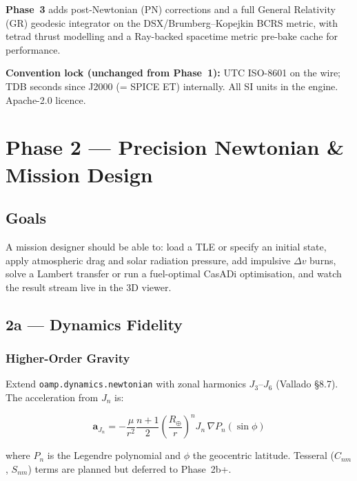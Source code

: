 \documentclass[11pt, a4paper]{article}
\begin{document}
\textbf{Phase~3} adds post-Newtonian (PN) corrections and a full General
Relativity (GR) geodesic integrator on the DSX/Brumberg--Kopejkin BCRS metric,
with tetrad thrust modelling and a Ray-backed spacetime metric pre-bake cache
for performance.

\begin{notebox}
\textbf{Convention lock (unchanged from Phase~1):}
UTC ISO-8601 on the wire; TDB seconds since J2000 (= SPICE ET) internally.
All SI units in the engine. Apache-2.0 licence.
\end{notebox}

\newpage
\section{Phase 2 — Precision Newtonian \& Mission Design}

\subsection{Goals}

A mission designer should be able to: load a TLE or specify an initial state,
apply atmospheric drag and solar radiation pressure, add impulsive $\Delta v$
burns, solve a Lambert transfer or run a fuel-optimal CasADi optimisation, and
watch the result stream live in the 3D viewer.

\subsection{2a — Dynamics Fidelity}

\subsubsection{Higher-Order Gravity}

Extend \texttt{oamp.dynamics.newtonian} with zonal harmonics $J_3$--$J_6$
(Vallado §8.7). The acceleration from $J_n$ is:

\begin{equation}
  \mathbf{a}_{J_n} = -\frac{\mu}{r^2} \frac{n+1}{2}
    \left(\frac{R_\oplus}{r}\right)^n J_n \,
    \nabla P_n(\sin\phi)
\end{equation}

where $P_n$ is the Legendre polynomial and $\phi$ the geocentric latitude.
Tesseral ($C_{nm}$, $S_{nm}$) terms are planned but deferred to Phase~2b+.
\end{document}
